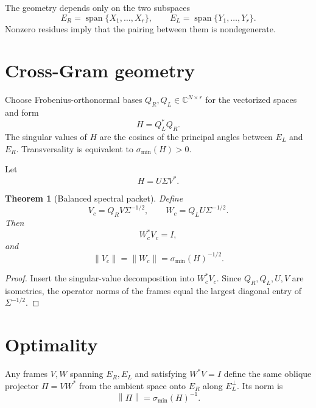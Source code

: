 \documentclass[12pt]{article}
\newtheorem{theorem}{Theorem}[section]
\theoremstyle{remark}
\newcommand{\norm}[1]{\left\lVert#1\right\rVert}
\begin{document}
The geometry depends only on the two subspaces
\begin{equation}\label{eq:spaces}
 E_R=\operatorname{span}\{X_1,\ldots,X_r\},
 \qquad
 E_L=\operatorname{span}\{Y_1,\ldots,Y_r\}.
\end{equation}
Nonzero residues imply that the pairing between them is nondegenerate.

\section{Cross-Gram geometry}

Choose Frobenius-orthonormal bases
$Q_R,Q_L\in\mathbb C^{N\times r}$ for the vectorized spaces and form
\begin{equation}\label{eq:cross-gram}
 H=Q_L^*Q_R.
\end{equation}
The singular values of $H$ are the cosines of the principal angles between
$E_L$ and $E_R$.  Transversality is equivalent to
$\sigma_{\min}(H)>0$.

Let
\begin{equation}\label{eq:svd}
 H=U\Sigma V^*.
\end{equation}

\begin{theorem}[Balanced spectral packet]\label{thm:balanced}
Define
\begin{equation}\label{eq:balanced-frames}
 V_c=Q_RV\Sigma^{-1/2},
 \qquad
 W_c=Q_LU\Sigma^{-1/2}.
\end{equation}
Then
\begin{equation}\label{eq:biorthogonal}
 W_c^*V_c=I,
\end{equation}
and
\begin{equation}\label{eq:frame-norms}
 \norm{V_c}=\norm{W_c}=\sigma_{\min}(H)^{-1/2}.
\end{equation}
\end{theorem}

\begin{proof}
Insert the singular-value decomposition into
$W_c^*V_c$.  Since $Q_R,Q_L,U,V$ are isometries, the operator norms of the
frames equal the largest diagonal entry of $\Sigma^{-1/2}$.
\end{proof}

\section{Optimality}

Any frames $V,W$ spanning $E_R,E_L$ and satisfying $W^*V=I$ define the same
oblique projector $\Pi=VW^*$ from the ambient space onto $E_R$ along
$E_L^\perp$.  Its norm is
\begin{equation}\label{eq:projector-norm}
 \norm\Pi=\sigma_{\min}(H)^{-1}.
\end{equation}
\end{document}

